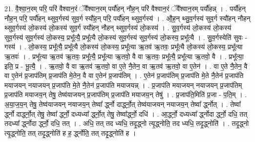 \documentclass[17pt]{extarticle}
\begin{document}
21. वै॒श्वा॒न॒रम् परि॒ परि॑ वैश्वान॒रं ॅवै᳚श्वान॒रम् पर्यौ॑हन् नौह॒न् परि॑ वैश्वान॒रं ॅवै᳚श्वान॒रम् पर्यौ॑हन्न् । . पर्यौ॑हन् नौह॒न् परि॒ पर्यौ॑हन् थ्सुव॒र्गस्य॑ सुव॒र्ग स्यौ॑ह॒न् परि॒ पर्यौ॑हन् थ्सुव॒र्गस्य॑ । . औ॒ह॒न् थ्सु॒व॒र्गस्य॑ सुव॒र्ग स्यौ॑हन् नौहन् थ्सुव॒र्गस्य॑ लो॒कस्य॑ लो॒कस्य॑ सुव॒र्ग स्यौ॑हन् नौहन् थ्सुव॒र्गस्य॑ लो॒कस्य॑ । . सु॒व॒र्गस्य॑ लो॒कस्य॑ लो॒कस्य॑ सुव॒र्गस्य॑ सुव॒र्गस्य॑ लो॒कस्य॒ प्रभू᳚त्यै॒ प्रभू᳚त्यै लो॒कस्य॑ सुव॒र्गस्य॑ सुव॒र्गस्य॑ लो॒कस्य॒ प्रभू᳚त्यै । . सु॒व॒र्गस्येति॑ सुवः - गस्य॑ । . लो॒कस्य॒ प्रभू᳚त्यै॒ प्रभू᳚त्यै लो॒कस्य॑ लो॒कस्य॒ प्रभू᳚त्या ऋ॒तव॑ ऋ॒तवः॒ प्रभू᳚त्यै लो॒कस्य॑ लो॒कस्य॒ प्रभू᳚त्या ऋ॒तवः॑ । . प्रभू᳚त्या ऋ॒तव॑ ऋ॒तवः॒ प्रभू᳚त्यै॒ प्रभू᳚त्या ऋ॒तवो॒ वै वा ऋ॒तवः॒ प्रभू᳚त्यै॒ प्रभू᳚त्या ऋ॒तवो॒ वै । . प्रभू᳚त्या॒ इति॒ प्र - भू॒त्यै॒ । . ऋ॒तवो॒ वै वा ऋ॒तव॑ ऋ॒तवो॒ वा ए॒ते नै॒तेन॒ वा ऋ॒तव॑ ऋ॒तवो॒ वा ए॒तेन॑ । . वा ए॒ते नै॒तेन॒ वै वा ए॒तेन॑ प्र॒जाप॑तिम् प्र॒जाप॑ति मे॒तेन॒ वै वा ए॒तेन॑ प्र॒जाप॑तिम् । . ए॒तेन॑ प्र॒जाप॑तिम् प्र॒जाप॑ति मे॒ते नै॒तेन॑ प्र॒जाप॑ति मयाजयन् नयाजयन् प्र॒जाप॑ति मे॒ते नै॒तेन॑ प्र॒जाप॑ति मयाजयन्न् । . प्र॒जाप॑ति मयाजयन् नयाजयन् प्र॒जाप॑तिम् प्र॒जाप॑ति मयाजय॒न् तेषु॒ तेष्व॑याजयन् प्र॒जाप॑तिम् प्र॒जाप॑ति मयाजय॒न् तेषु॑ । . प्र॒जाप॑ति॒मिति॑ प्र॒जा - प॒ति॒म् । . अ॒या॒ज॒य॒न् तेषु॒ तेष्व॑याजयन् नयाजय॒न् तेष्वा᳚ र्द्ध्नो दार्द्ध्नो॒त् तेष्व॑याजयन् नयाजय॒न् तेष्वा᳚ र्द्ध्नोत् । . तेष्वा᳚ र्द्ध्नो दार्द्ध्नो॒त् तेषु॒ तेष्वा᳚ र्द्ध्नो॒ दध्यध्या᳚ र्द्ध्नो॒त् तेषु॒ तेष्वा᳚र्द्ध्नो॒ दधि॑ । . आ॒र्द्ध्नो॒ दध्यध्या᳚ र्द्ध्नोदा र्द्ध्नो॒ दधि॒ तत् तदध्या᳚ र्द्ध्नोदा र्द्ध्नो॒ दधि॒ तत् । . अधि॒ तत् तद ध्यधि॒ तदृ॒द्ध्नो त्यृ॒द्ध्नोति॒ तद ध्यधि॒ तदृ॒द्ध्नोति॑ । . तदृ॒द्ध्नो त्यृ॒द्ध्नोति॒ तत् तदृ॒द्ध्नोति॑ ह ह॒ र्द्ध्नोति॒ तत् तदृ॒द्ध्नोति॑ ह । \newline
\end{document}
